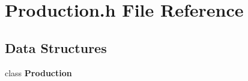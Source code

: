 \section{Production.\+h File Reference}
\label{Production_8h}
\subsection*{Data Structures}
\begin{DoxyCompactItemize}
\item 
class \textbf{ Production}
\end{DoxyCompactItemize}
